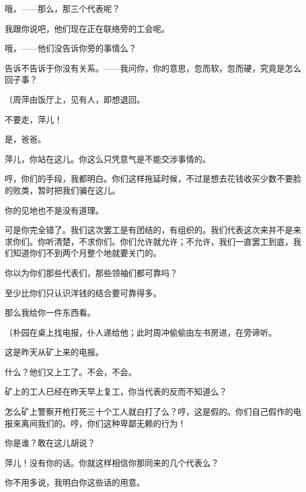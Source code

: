 哦，——那么，那三个代表呢？

我跟你说吧，他们现在正在联络旁的工会呢。

哦，——他们没告诉你旁的事情么？

告诉不告诉于你没有关系。——我问你，你的意思，忽而软，忽而硬，究竟是怎么回子事？

{\fangsong〔周萍由饭厅上，见有人，即想退回。}

不要走，萍儿！

是，爸爸。

萍儿，你站在这儿。你这么只凭意气是不能交涉事情的。

哼，你们的手段，我都明白。你们这样拖延时候，不过是想去花钱收买少数不要脸的败类，暂时把我们骗在这儿。

你的见地也不是没有道理。

可是你完全错了。我们这次罢工是有团结的，有组织的。我们代表这次来并不是来求你们。你听清楚，不求你们。你们允许就允许；不允许，我们一直罢工到底，我们知道你们不到两个月整个地就要关门的。

你以为你们那些代表们，那些领袖们都可靠吗？

至少比你们只认识洋钱的结合要可靠得多。

那么我给你一件东西看。

{\fangsong〔朴园在桌上找电报，仆人递给他；此时周冲偷偷由左书房进，在旁谛听。}

这是昨天从矿上来的电报。

什么？他们又上工了。不会，不会。

矿上的工人已经在昨天早上复工，你当代表的反而不知道么？

怎么矿上警察开枪打死三十个工人就白打了么？哼，这是假的。你们自己假作的电报来离间我们的。哼，你们这种卑鄙无赖的行为！

你是谁？敢在这儿胡说？

萍儿！没有你的话。你就这样相信你那同来的几个代表么？

你不用多说，我明白你这些话的用意。

